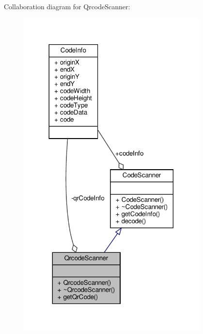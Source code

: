 Collaboration diagram for Qrcode\+Scanner\+:
\nopagebreak
\begin{figure}[H]
\begin{center}
\leavevmode
\includegraphics[width=272pt]{class_qrcode_scanner__coll__graph}
\end{center}
\end{figure}
